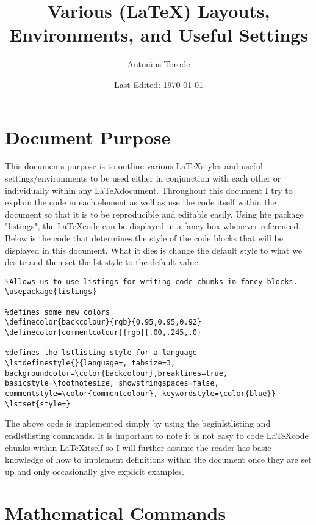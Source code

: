 \documentclass[11pt]{article}
\title{Various (\LaTeX) Layouts, Environments, and Useful Settings}
\author{Antonius Torode}
\date{Last Edited: \today}
\begin{document}
\maketitle
\tableofcontents

\newpage

\section{Document Purpose}
This documents purpose is to outline various \LaTeX styles and useful settings/environments to be used either in conjunction with each other or individually within any \LaTeX document. Throughout this document I try to explain the code in each element as well as use the code itself within the document so that it is to be reproducible and editable easily. Using hte package "listings", the \LaTeX code can be displayed in a fancy box whenever referenced. Below is the code that determines the style of the code blocks that will be displayed in this document. What it dies is change the default style to what we desite and then set the lst style to the default value.
\begin{lstlisting}
%Allows us to use listings for writing code chunks in fancy blocks.
\usepackage{listings}

%defines some new colors
\definecolor{backcolour}{rgb}{0.95,0.95,0.92}
\definecolor{commentcolour}{rgb}{.00,.245,.0}

%defines the lstlisting style for a language
\lstdefinestyle{}{language=, tabsize=3, backgroundcolor=\color{backcolour},breaklines=true, basicstyle=\footnotesize, showstringspaces=false, commentstyle=\color{commentcolour}, keywordstyle=\color{blue}}
\lstset{style=}
\end{lstlisting}
The above code is implemented simply by using the begin{lstlisting} and end{lstlisting} commands. It is important to note it is not easy to code \LaTeX code chunks within \LaTeX itself so I will further assume the reader has basic knowledge of how to implement definitions within the document once they are set up and only occasionally give explicit examples.

\section{Mathematical Commands}
\end{document}
